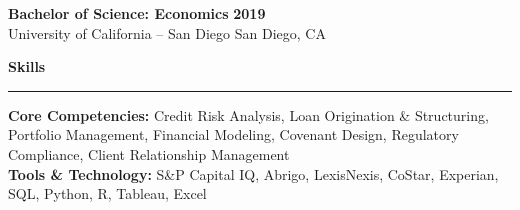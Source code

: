 \documentclass[letterpaper,11pt]{article}
\renewcommand{\section}[1]{%
  \vspace{5pt}%
  {\large\bfseries\color{sectionblue}#1}\\[-6pt]%
  {\color{sectionblue}\rule{\textwidth}{0.8pt}}%
  \vspace{1pt}%
}
\begin{document}
\textbf{Bachelor of Science: Economics} \hfill \textbf{2019}\\
University of California -- San Diego \hfill San Diego, CA

\section{Skills}

\textbf{Core Competencies:} Credit Risk Analysis, Loan Origination \& Structuring, Portfolio Management, Financial Modeling, Covenant Design, Regulatory Compliance, Client Relationship Management\\[2pt]
\textbf{Tools \& Technology:} S\&P Capital IQ, Abrigo, LexisNexis, CoStar, Experian, SQL, Python, R, Tableau, Excel
\end{document}
